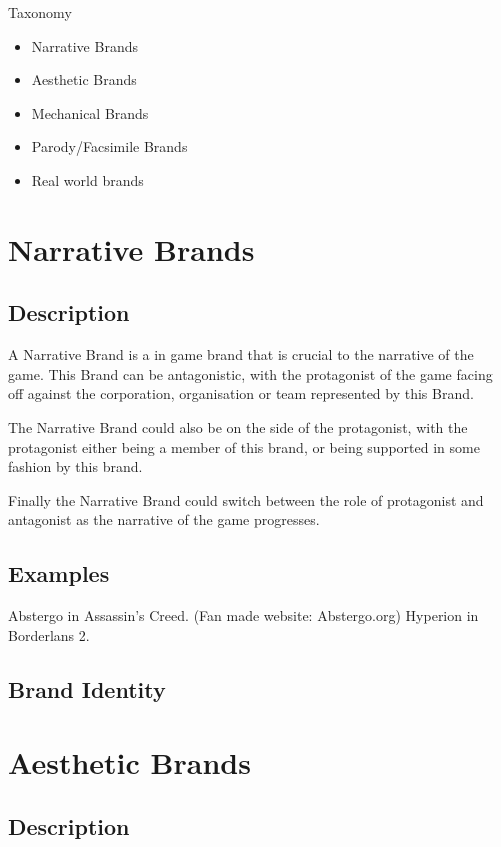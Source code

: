 Taxonomy
\begin{itemize}
    \item Narrative Brands
    \item Aesthetic Brands
    \item Mechanical Brands
    \item Parody/Facsimile Brands
    \item Real world brands 
\end{itemize}

\section{Narrative Brands}

\subsection{Description}

A Narrative Brand is a in game brand that is crucial to the narrative of the game. This Brand can be antagonistic, with the protagonist of the game facing off against the corporation, organisation or team represented by this Brand.

The Narrative Brand could also be on the side of the protagonist, with the protagonist either being a member of this brand, or being supported in some fashion by this brand.

Finally the Narrative Brand could switch between the role of protagonist and antagonist as the narrative of the game progresses.

\subsection{Examples}

Abstergo in Assassin's Creed. (Fan made website: Abstergo.org)
Hyperion in Borderlans 2.

\subsection{Brand Identity}

\section{Aesthetic Brands}

\subsection{Description}

